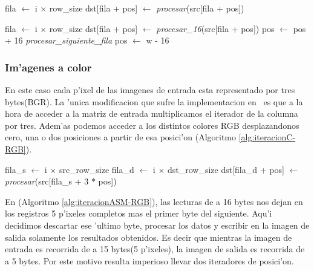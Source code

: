 \begin{algorithm}[h!]
\caption{}\label{alg:iteracionC-BN}
\begin{algorithmic}[1]
	\STATE fila $\leftarrow$ i $\times$ row\_size
		\STATE dst[fila + pos] $\leftarrow$ \textit{procesar}(src[fila + pos])
	\ENDFOR
\ENDFOR
\end{algorithmic}
\end{algorithm}

\begin{algorithm}[h!]
\caption{}\label{alg:iteracionASM-BN}
\begin{algorithmic}[1]
	\STATE fila $\leftarrow$ i $\times$ row\_size
		\STATE dst[fila + pos] $\leftarrow$ \textit{procesar_{16}}(src[fila + pos])
		\STATE pos $\leftarrow$ pos + 16		
			\STATE \textit{procesar\_siguiente\_fila}
			\STATE pos $\leftarrow$ w - 16
		\ENDIF
		
	\ENDFOR
\ENDFOR
\end{algorithmic}
\end{algorithm}

\subsubsection{Im'agenes a color}
\label{sec:ciclos-color}
En este caso cada p'ixel de las imagenes de entrada esta representado por tres bytes(BGR). La 'unica modificacion que sufre la implementacion en \C\ es que a la hora de acceder a la matriz de entrada multiplicamos el iterador de la columna por tres. Adem'as podemos acceder a los distintos colores RGB desplazandonos cero, una o dos posiciones a partir de esa posici'on (Algoritmo \ref{alg:iteracionC-RGB}).


\begin{algorithm}[h!]
\caption{}\label{alg:iteracionC-RGB}
\begin{algorithmic}[1]
	\STATE fila_s $\leftarrow$ i $\times$ src\_row\_size	
	\STATE fila_d $\leftarrow$ i $\times$ dst\_row\_size
		\STATE dst[fila_d + pos] $\leftarrow$ \textit{procesar}(src[fila_s + 3 $*$ pos])
	\ENDFOR
\ENDFOR
\end{algorithmic}
\end{algorithm}

En \ass (Algoritmo \ref{alg:iteracionASM-RGB}), las lecturas de a 16 bytes nos dejan en los registros 5 p'ixeles completos mas el primer byte del siguiente. Aqu'i decidimos descartar ese 'ultimo byte, procesar los datos y escribir en la imagen de salida solamente los resultados obtenidos. Es decir que mientras la imagen de entrada es recorrida de a 15 bytes(5 p'ixeles), la imagen de salida es recorrida de a 5 bytes. Por este motivo resulta imperioso llevar dos iteradores de posici'on.

